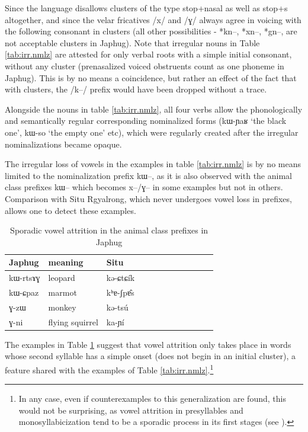\documentclass[oldfontcommands,oneside,a4paper,11pt]{article}
\newcommand{\ipa}[1]{{\phon \mbox{#1}}} %
\begin{document}
Since the language  disallows  clusters of the type stop+nasal as well as stop+s altogether, and since the velar fricatives /x/ and /ɣ/ always agree in voicing with the following consonant in clusters (all other possibilities - *\ipa{kn}--, *\ipa{xn}--, *\ipa{gn}--, are not acceptable clusters in Japhug). Note that irregular nouns in Table \ref{tab:irr.nmlz} are attested for only verbal roots with a simple initial consonant, without any cluster (prenasalized voiced obstruents count as one phoneme in Japhug). This is by no means a coincidence, but rather an effect of the fact that with clusters, the /k--/ prefix would have been dropped without a trace.


Alongside the nouns in table \ref{tab:irr.nmlz}, all four verbs allow the  phonologically and semantically regular corresponding nominalized forms (\ipa{kɯ-ɲaʁ} `the black one', \ipa{kɯ-so} `the empty one' etc), which were regularly created after the irregular nominalizations became opaque. 

The irregular loss of vowels in the examples in table \ref{tab:irr.nmlz} is by no means limited to the nominalization prefix \ipa{kɯ}--, as it is also observed with the animal class prefixes \ipa{kɯ}-- which becomes \ipa{x--}/\ipa{ɣ--}  in some examples but not in others. Comparison with Situ Rgyalrong, which never undergoes vowel loss in prefixes, allows one to detect these examples.

\begin{table}[H]
\caption{Sporadic vowel attrition in the animal class prefixes in Japhug} \label{tab:animal} \centering
\begin{tabular}{llllllllllll}
\toprule
Japhug & meaning & Situ     \\
\midrule
\ipa{kɯ-rtsɤɣ} & leopard & \ipa{kə-ɕtɕík} \\
\ipa{kɯ-ɕpaz} & marmot & \ipa{kʰɐ-ʃpɐ̂s} \\
\midrule
\ipa{ɣ-zɯ} & monkey & \ipa{kə-tsú}\\
\ipa{ɣ-ni} & flying squirrel & \ipa{ka-ɲí}\\
\bottomrule
\end{tabular}
\end{table}
The examples in Table \ref{tab:animal} suggest that vowel attrition only takes place in words whose second syllable has a simple onset (does not begin in an initial cluster), a feature shared with the examples of Table \ref{tab:irr.nmlz}.\footnote{In any case, even if counterexamples to this generalization are found, this would not be surprising, as vowel attrition in presyllables and monosyllabicization tend to be a sporadic process in its first stages (see \citealt{michaud12mono}).}
\end{document}
